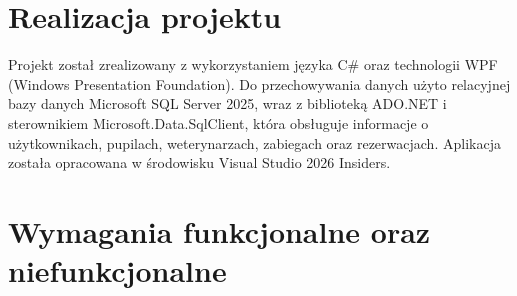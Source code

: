 \section{Realizacja projektu}

Projekt został zrealizowany z wykorzystaniem języka C\# oraz 
technologii WPF (Windows Presentation Foundation). Do przechowywania 
danych użyto relacyjnej bazy danych Microsoft SQL Server 2025, wraz 
z biblioteką ADO.NET i sterownikiem 
Microsoft.Data.SqlClient, która obsługuje informacje o użytkownikach, 
pupilach, weterynarzach, zabiegach oraz rezerwacjach. Aplikacja została 
opracowana w środowisku Visual Studio 2026 Insiders.

\section{Wymagania funkcjonalne oraz niefunkcjonalne}

